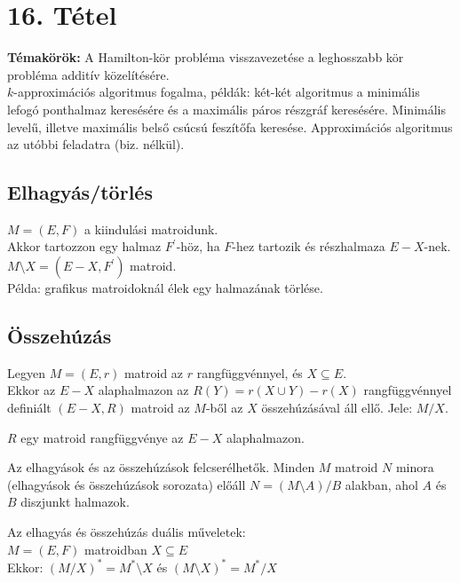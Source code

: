 
\setcounter{chapter}{16}
\chapter*{16. Tétel}

\textbf{Témakörök:} A Hamilton-kör probléma visszavezetése a leghosszabb kör probléma additív közelítésére.\\ $k$-approximációs algoritmus fogalma, példák: két-két algoritmus a minimális lefogó ponthalmaz keresésére és a maximális páros részgráf keresésére. Minimális levelű, illetve maximális belső csúcsú feszítőfa keresése. Approximációs algoritmus az utóbbi feladatra (biz. nélkül).

\noindent\hrulefill

\section*{Elhagyás/törlés}
$M=(E,F)$ a kiindulási matroidunk.\\
Akkor tartozzon egy halmaz $F^{'}$-höz, ha $F$-hez tartozik és részhalmaza $E-X$-nek.\\
$M\setminus X=(E-X,F^{'})$ matroid.\\
Példa: grafikus matroidoknál élek egy halmazának törlése.

\section*{Összehúzás}
Legyen $M=(E,r)$ matroid az $r$ rangfüggvénnyel, és $X\subseteq E$.\\
Ekkor az $E-X$ alaphalmazon az $R(Y)=r(X\cup Y)-r(X)$ rangfüggvénnyel definiált $(E-X,R)$ matroid az $M$-ből az $X$ összehúzásával áll ellő. Jele: $M/X$.

\begin{lem}
$R$ egy matroid rangfüggvénye az $E-X$ alaphalmazon.
\end{lem}

\begin{theo}
Az elhagyások és az összehúzások felcserélhetők. Minden $M$ matroid $N$ minora (elhagyások és összehúzások sorozata) előáll $N=(M\setminus A)/B$ alakban, ahol $A$ és $B$ diszjunkt halmazok.
\end{theo}

\begin{theo}
Az elhagyás és összehúzás duális műveletek:\\
$M=(E,F)$ matroidban $X\subseteq E$\\
Ekkor: $(M/X)^{*}=M^{*}\setminus X$ és $(M\setminus X)^{*}=M^{*}/X$
\end{theo}

